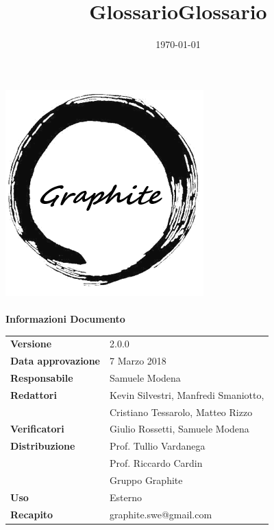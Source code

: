 \documentclass[openany,12pt,a4paper]{report}
\title{Glossario}
\author{}
\date{\today}
\title {Glossario}
\newcommand{\versione}{2.0.0}
\begin{document}
		
	\makeatletter
	\begin{titlepage}
		\setlength{\headsep}{0pt}  
		\begin{center}			
			\includegraphics[width=0.5\linewidth]{Logo.png}\\[1em]
			{\huge \bfseries  \@title }\\[10ex]
			\textbf{\Large Informazioni Documento} \\[2em]
			\bgroup
			\def\arraystretch{1.5}
			\begin{tabular}{l|l}
				\textbf{Versione} & \versione{} \\
				\textbf{Data approvazione} & 7 Marzo 2018 \\
				\textbf{Responsabile} & Samuele Modena \\
				\textbf{Redattori} & Kevin Silvestri, Manfredi Smaniotto,\\
				& Cristiano Tessarolo, Matteo Rizzo \\
				\textbf{Verificatori} & Giulio Rossetti, Samuele Modena \\
				\textbf{Distribuzione} & Prof. Tullio Vardanega \\
				& Prof. Riccardo Cardin \\
				& Gruppo Graphite \\
				\textbf{Uso} & Esterno \\
				\textbf{Recapito} & graphite.swe@gmail.com \\
			\end{tabular}
			\egroup
		\end{center}
	\end{titlepage}
	\makeatother
	
	\thispagestyle{empty}
	\newpage
	
	
	\tableofcontents
	\printglossary[style=glossaryStyle, nonumberlist]
\end{document}
